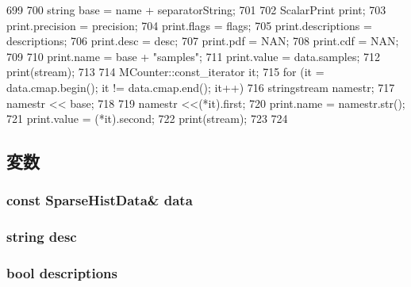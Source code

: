 \begin{DoxyCode}
699 {
700     string base = name + separatorString;
701 
702     ScalarPrint print;
703     print.precision = precision;
704     print.flags = flags;
705     print.descriptions = descriptions;
706     print.desc = desc;
707     print.pdf = NAN;
708     print.cdf = NAN;
709 
710     print.name = base + "samples";
711     print.value = data.samples;
712     print(stream);
713 
714     MCounter::const_iterator it;
715     for (it = data.cmap.begin(); it != data.cmap.end(); it++) {
716         stringstream namestr;
717         namestr << base;
718 
719         namestr <<(*it).first;
720         print.name = namestr.str();
721         print.value = (*it).second;
722         print(stream);
723     }
724 }
\end{DoxyCode}


\subsection{変数}
\hypertarget{structStats_1_1SparseHistPrint_a9b090a39883ae5dec719f9fe3a85a341}{
\subsubsection[{data}]{\setlength{\rightskip}{0pt plus 5cm}const {\bf SparseHistData}\& {\bf data}}}
\label{structStats_1_1SparseHistPrint_a9b090a39883ae5dec719f9fe3a85a341}
\hypertarget{structStats_1_1SparseHistPrint_acc6fde76f2c440ef4a9f7dc3765038b5}{
\subsubsection[{desc}]{\setlength{\rightskip}{0pt plus 5cm}string {\bf desc}}}
\label{structStats_1_1SparseHistPrint_acc6fde76f2c440ef4a9f7dc3765038b5}
\hypertarget{structStats_1_1SparseHistPrint_ada0eec8923acca0939a06f40c6a88af8}{
\subsubsection[{descriptions}]{\setlength{\rightskip}{0pt plus 5cm}bool {\bf descriptions}}}

